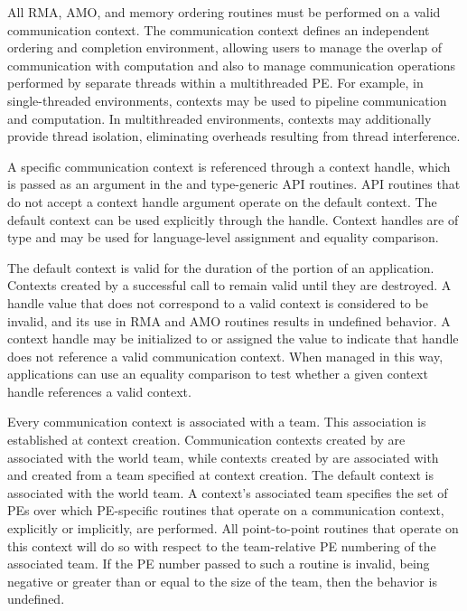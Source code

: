 All \openshmem \ac{RMA}, \ac{AMO}, and memory ordering routines must be
performed on a valid communication context.  The communication context defines an
independent ordering and completion environment, allowing users to manage the
overlap of communication with computation and also to manage communication
operations performed by separate threads within a multithreaded \ac{PE}.  For
example, in single-threaded environments, contexts may be used to pipeline
communication and computation.  In multithreaded environments, contexts may
additionally provide thread isolation, eliminating overheads resulting from
thread interference.

A specific communication context is referenced through a context handle, which is
passed as an argument in the  and type-generic \ac{API}
routines.  \ac{API} routines that do not accept a context handle argument operate on the
default context.  The default context can be used explicitly through the
 handle.
Context handles are of type  and may be used for
language-level assignment and equality comparison.

The default context is valid for the duration of the \openshmem portion of
an application.
Contexts created by a successful call to  remain
valid until they are destroyed.
A handle value that does not correspond to a valid context is considered
to be invalid, and its use in \ac{RMA} and \ac{AMO} routines results in
undefined behavior.
A context handle may be initialized to or assigned the value
 to indicate that handle does not reference a
valid communication context.
When managed in this way, applications can use an equality comparison
to test whether a given context handle references a valid context.

Every communication context is associated with a team.
This association is established at context creation.
Communication contexts created by  are
associated with the world team, while contexts created by
 are associated with and created from a team
specified at context creation.
The default context is associated with the world team.
A context's associated team specifies the set of \acp{PE} over which
\ac{PE}-specific routines that operate on a communication context,
explicitly or implicitly, are performed.
All point-to-point routines that operate on this context will do so with
respect to the team-relative \ac{PE} numbering of the associated team.
If the \ac{PE} number passed to such a routine is invalid, being negative or greater
than or equal to the size of the \openshmem team, then the behavior is undefined.

